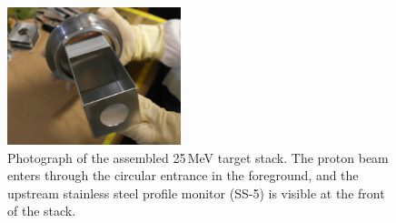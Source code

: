 \begin{figure}[ht]
 \centering
 \includegraphics[width=0.45\textwidth]{./figures/SAM_2494.JPG}
 \caption{\label{fig:fe_target_stack}Photograph of the assembled 25\,MeV target stack.
 The proton beam enters through the circular entrance in the foreground, and the upstream stainless steel profile monitor (SS-5) is visible at the front of the stack.}
\end{figure}

